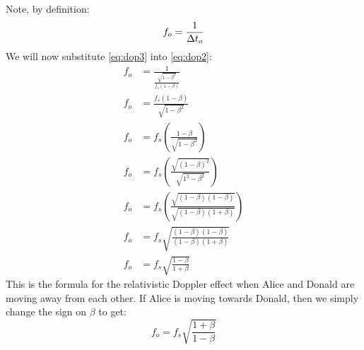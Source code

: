 		Note, by definition:
		\begin{equation}\label{eq:dop2}
			f_o = \frac{1}{\mathrm{\Delta} t_o}
		\end{equation}
		We will now substitute \eqref{eq:dop3} into \eqref{eq:dop2}:
		\begin{align}
			f_o &= \frac{1}{\frac{\sqrt{1 - \beta^2}}{f_s(1 - \beta)}}\nonumber\\
			f_o &= \frac{f_s(1 - \beta)}{\sqrt{1 - \beta^2}}\nonumber\\
			f_o &= f_s\left(\frac{1 - \beta}{\sqrt{1 - \beta^2}}\right)\nonumber\\
			f_o &= f_s\left(\frac{\sqrt{(1 - \beta)^2}}{\sqrt{1^2 - \beta^2}}\right)\nonumber\\
			f_o &= f_s\left(\frac{\sqrt{(1 - \beta)(1 - \beta)}}{\sqrt{(1 - \beta)(1 + \beta)}}\right)\nonumber\\
			f_o &= f_s\sqrt{\frac{(1 - \beta)(1 - \beta)}{(1 - \beta)(1 + \beta)}}\nonumber\\
			f_o &= f_s \sqrt{\frac{1 - \beta}{1 + \beta}}\label{eq:relDopAway}
		\end{align}
		This is the formula for the relativistic Doppler effect when Alice and Donald are moving away from each other.
		If Alice is moving towards Donald, then we simply change the sign on $\beta$ to get:
		\begin{equation}\label{eq:relDopTowards}
			f_o = f_s \sqrt{\frac{1 + \beta}{1 - \beta}}
		\end{equation}
